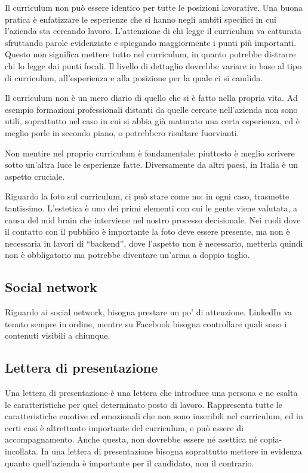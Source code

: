 Il curriculum non può essere identico per tutte le posizioni lavorative. Una
buona pratica è enfatizzare le esperienze che si hanno negli ambiti specifici
in cui l'azienda sta cercando lavoro. L'attenzione di chi legge il curriculum
va catturata sfruttando parole evidenziate e spiegando maggiormente i punti più
importanti. Questo non significa mettere tutto nel curriculum, in quanto
potrebbe distrarre chi lo legge dai punti focali. Il livello di dettaglio
dovrebbe variare in base al tipo di curriculum, all'esperienza e alla posizione
per la quale ci si candida.

Il curriculum non è un mero diario di quello che si è fatto nella propria vita.
Ad esempio formazioni professionali distanti da quelle cercate nell'azienda non
sono utili, soprattutto nel caso in cui si abbia già maturato una certa
esperienza, ed è meglio porle in secondo piano, o potrebbero risultare
fuorvianti.

Non mentire nel proprio curriculum è fondamentale: piuttosto è
meglio scrivere sotto un'altra luce le esperienze fatte. Diversamente da altri
paesi, in Italia è un aspetto cruciale.

Riguardo la foto sul curriculum, ci può stare come no: in ogni caso, trasmette
tantissimo. L'estetica è uno dei primi elementi con cui le gente viene
valutata, a causa del mid brain che interviene nel nostro processo decisionale.
Nei ruoli dove il contatto con il pubblico è importante la foto deve essere
presente, ma non è necessaria in lavori di ``backend'', dove l'aspetto non è
necessario, metterla quindi non è obbligatorio ma potrebbe diventare un'arma
a doppio taglio.

\subsection{Social network}
Riguardo ai social network, bisogna prestare un po' di attenzione. LinkedIn va
tenuto sempre in ordine, mentre su Facebook bisogna controllare quali sono i
contenuti visibili a chiunque.

\subsection{Lettera di presentazione}
Una lettera di presentazione è una lettera che introduce una persona e ne
esalta le caratteristiche per quel determinato posto di lavoro. Rappresenta
tutte le caratteristiche emotive ed emozionali che non sono inseribili nel
curriculum, ed in certi casi è altrettanto importante del curriculum, e
può essere di accompagnamento. Anche questa, non dovrebbe essere né asettica né
copia-incollata. In una lettera di presentazione bisogna soprattutto mettere in
evidenza quanto quell'azienda è importante per il candidato, non il contrario.
